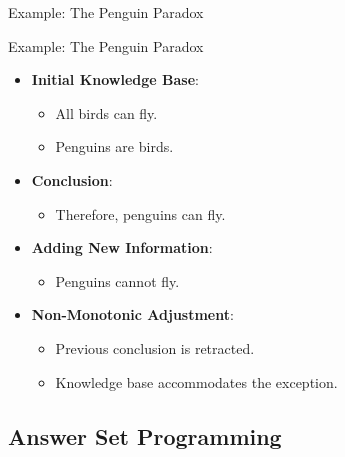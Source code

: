\begin{frame}{Example: The Penguin Paradox}
    \begin{exampleblock}{Example: The Penguin Paradox}
        \begin{itemize}
            \item \textbf{Initial Knowledge Base}:
                  \begin{itemize}
                      \item All birds can fly.
                      \item Penguins are birds.
                  \end{itemize}
            \item \textbf{Conclusion}:
                  \begin{itemize}
                      \item Therefore, penguins can fly.
                  \end{itemize}
            \item \textbf{Adding New Information}:
                  \begin{itemize}
                      \item Penguins cannot fly.
                  \end{itemize}
            \item \textbf{Non-Monotonic Adjustment}:
                  \begin{itemize}
                      \item Previous conclusion is retracted.
                      \item Knowledge base accommodates the exception.
                  \end{itemize}
        \end{itemize}
    \end{exampleblock}
\end{frame}

\subsection{Answer Set Programming}

